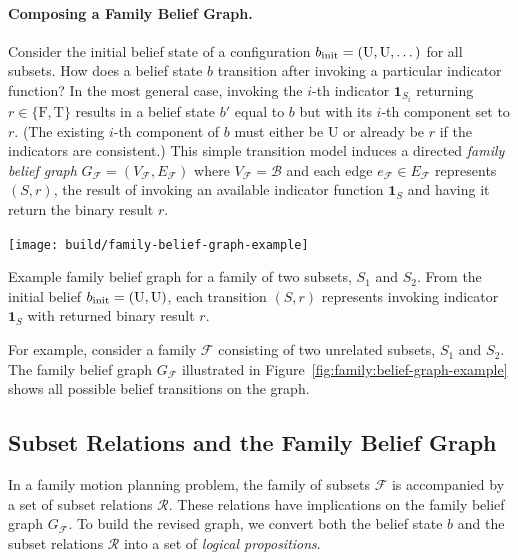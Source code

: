 \paragraph{Composing a Family Belief Graph.}
Consider the initial belief state of a configuration
$b_{\mbox{\scriptsize init}} = \left( \mbox{U}, \mbox{U}, \dots \right)$
for all subsets.
How does a belief state $b$ transition after invoking a particular
indicator function?
In the most general case,
invoking the $i$-th indicator $\mathbf{1}_{S_i}$ returning
$r \in \{\mbox{F},\mbox{T}\}$
results in a belief state $b'$ equal to $b$ but with its
$i$-th component set to $r$.
(The existing $i$-th component of $b$ must either be U
or already be $r$ if the indicators are consistent.)
This simple transition model induces a directed
\emph{family belief graph}
$G_{\mathcal{F}} = (V_{\mathcal{F}}, E_{\mathcal{F}})$
where $V_{\mathcal{F}} = \mathcal{B}$
and each edge $e_{\mathcal{F}} \in E_{\mathcal{F}}$ represents $(S,r)$,
the result of invoking an available indicator function $\mathbf{1}_{S}$
and having it return the binary result $r$.

\begin{marginfigure}
   \centering
   \texttt{[image: build/family-belief-graph-example]}
   \caption{Example family belief graph
      for a family of two subsets, $S_1$ and $S_2$.
      From the initial belief $b_{\mbox{\scriptsize init}} = (\mbox{U},\mbox{U})$,
      each transition $(S,r)$ represents invoking
      indicator $\mathbf{1}_S$ with returned binary result $r$.
      }
   \label{fig:family:belief-graph-example}
\end{marginfigure}

For example,
consider a family $\mathcal{F}$ consisting of two unrelated subsets,
$S_1$ and $S_2$.
The family belief graph $G_{\mathcal{F}}$
illustrated in Figure~\ref{fig:family:belief-graph-example}
shows all possible belief transitions on the graph.

\subsection{Subset Relations and the Family Belief Graph}
In a family motion planning problem,
the family of subsets $\mathcal{F}$
is accompanied by a set of subset relations $\mathcal{R}$.
These relations have implications on the family belief graph
$G_{\mathcal{F}}$.
To build the revised graph,
we convert both the belief state $b$
and the subset relations $\mathcal{R}$
into a set of \emph{logical propositions}.

